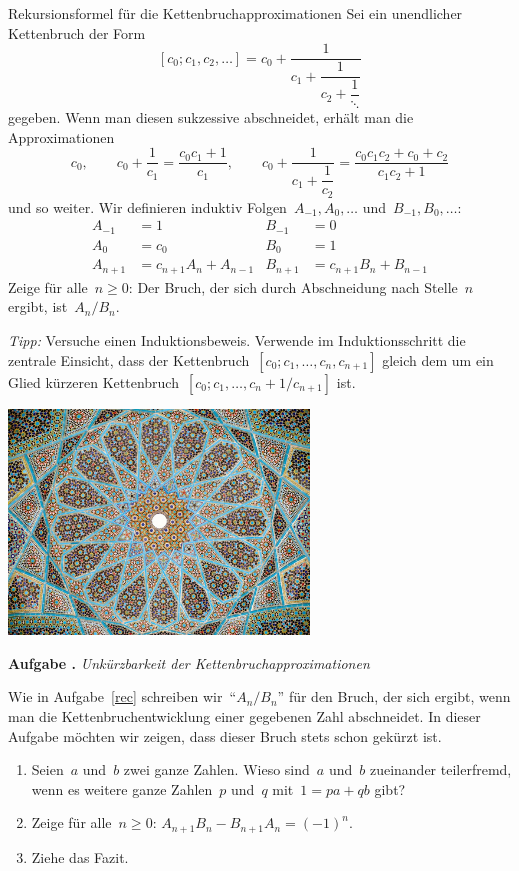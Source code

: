 \documentclass[a4paper,ngerman,twoside]{scrartcl}
\newlength{\aufgabenskip}
\newcounter{aufgabennummer}
\newenvironment{aufgabe}[1]{
  \addtocounter{aufgabennummer}{1}
  \textbf{Aufgabe \theaufgabennummer.} \emph{#1} \par
}{\vspace{\aufgabenskip}}
\newenvironment{aufgabe*}[1]{
  \addtocounter{aufgabennummer}{1}
  \textbf{Aufgabe* \theaufgabennummer.} \emph{#1} \par
}{\vspace{\aufgabenskip}}
\begin{document}
\begin{aufgabe*}{Rekursionsformel für die Kettenbruchapproximationen}\label{rec}
Sei ein unendlicher Kettenbruch der Form
\[ [c_0;c_1,c_2,\ldots] = c_0 + \dfrac{1}{c_1 + \dfrac{1}{c_2 + \dfrac{1}{\ddots}}} \]
gegeben. Wenn man diesen sukzessive abschneidet, erhält man die Approximationen
\[ c_0, \qquad
  c_0 + \dfrac{1}{c_1} = \frac{c_0c_1 + 1}{c_1}, \qquad
  c_0 + \dfrac{1}{c_1 + \dfrac{1}{c_2}} = \frac{c_0c_1c_2 + c_0 +
  c_2}{c_1c_2+1}
\]
und so weiter. Wir definieren induktiv Folgen~$A_{-1},A_0,\ldots$
und~$B_{-1},B_0,\ldots$:
\begin{align*}
  A_{-1} &= 1 & B_{-1} &= 0 \\
  A_0 &= c_0 & B_0 &= 1 \\
  A_{n+1} &= c_{n+1} A_n + A_{n-1} & B_{n+1} &= c_{n+1} B_n + B_{n-1}
\end{align*}
Zeige für alle~$n \geq 0$: Der Bruch, der sich durch Abschneidung nach
Stelle~$n$ ergibt, ist~$A_n/B_n$.

\emph{Tipp:} Versuche einen Induktionsbeweis. Verwende im Induktionsschritt die
zentrale Einsicht, dass der Kettenbruch~$[c_0;c_1,\ldots,c_n,c_{n+1}]$ gleich
dem um ein Glied kürzeren Kettenbruch~$[c_0;c_1,\ldots,c_n+1/c_{n+1}]$ ist.
\end{aufgabe*}

\vfill
\begin{center}\includegraphics[width=0.60\textwidth]{hafez-tomb}\end{center}

\begin{aufgabe}{Unkürzbarkeit der Kettenbruchapproximationen}
Wie in Aufgabe~\ref{rec} schreiben wir~"`$A_n/B_n$"' für den Bruch, der sich
ergibt, wenn man die Kettenbruchentwicklung einer gegebenen Zahl abschneidet.
In dieser Aufgabe möchten wir zeigen, dass dieser Bruch stets schon gekürzt
ist.
\begin{enumerate}
\item Seien~$a$ und~$b$ zwei ganze Zahlen. Wieso sind~$a$ und~$b$ zueinander
teilerfremd, wenn es weitere ganze Zahlen~$p$ und~$q$ mit~$1 = pa + qb$ gibt?
\item Zeige für alle~$n \geq 0$: $A_{n+1} B_n - B_{n+1} A_n = (-1)^n$.
\item Ziehe das Fazit.
\end{enumerate}
\end{aufgabe}
\end{document}
